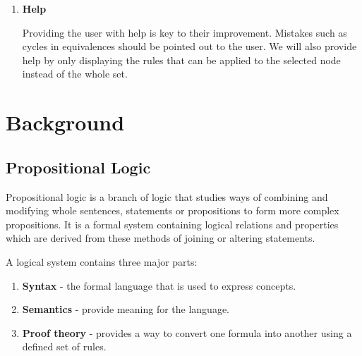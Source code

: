 \documentclass{report}
\begin{document}
\begin{enumerate}
\item \textbf{Help}

Providing the user with help is key to their improvement. Mistakes such as cycles in equivalences should be pointed out to the user. We will also provide help by only displaying the rules that can be applied to the selected node instead of the whole set.


\end{enumerate}

\chapter{Background} 

\section{Propositional Logic}

Propositional logic is a branch of logic that studies ways of combining and modifying whole sentences, statements or propositions to form more complex propositions. It is a formal system containing logical relations and properties which are derived from these methods of joining or altering statements.

A logical system contains three major parts:

\begin{enumerate}
\item \textbf{Syntax} - the formal language that is used to express concepts.
\item \textbf{Semantics} - provide meaning for the language.
\item \textbf{Proof theory} - provides a way to convert one formula into another using a defined set of rules.
\end{enumerate}
\end{document}
